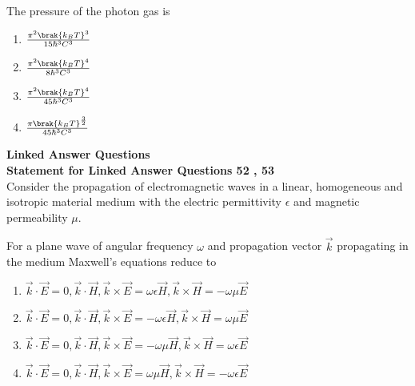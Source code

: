 \begin{enumerate}
\begin{multicols}{2}
\begin{center}
                    \end{center}
            \end{multicols}
            \end{enumerate}

        \item[51.] The pressure of the photon gas is
            \hfill{}
            \begin{enumerate}
                \item $\frac{\pi^2 \brak{k_B T}^3}{15\hbar ^3 C^3}$
                \item $\frac{\pi^2 \brak{k_B T}^4}{8\hbar ^3 C^3}$
                \item $\frac{\pi^2 \brak{k_B T}^4}{45\hbar ^3 C^3}$
                \item $\frac{\pi \brak{k_B T}^\frac{3}{2}}{45\hbar ^3 C^3}$
            \end{enumerate}

            \textbf{Linked Answer Questions}\\
            \textbf{Statement for Linked Answer Questions 52 , 53}\\
            Consider the propagation of electromagnetic waves in a linear, homogeneous and isotropic
            material medium with the electric permittivity $\epsilon$ and magnetic permeability $\mu$.\\
        \item[52.] For a plane wave of angular frequency $\omega$ and propagation vector $\vec{k}$ propagating
            in the medium Maxwell's equations reduce to
            \hfill{}
            \begin{enumerate}
                \item $\vec{k}\cdot \vec{E} = 0, \vec{k}\cdot \vec{H}, \vec{k} \times \vec{E}=\omega\epsilon \vec{H}, \vec{k} \times \vec{H}=-\omega\mu\vec{E}$ 
                \item $\vec{k}\cdot \vec{E} = 0, \vec{k}\cdot \vec{H}, \vec{k} \times \vec{E}=-\omega\epsilon \vec{H}, \vec{k} \times \vec{H}=\omega\mu\vec{E}$ 
                \item $\vec{k}\cdot \vec{E} = 0, \vec{k}\cdot \vec{H}, \vec{k} \times \vec{E}=-\omega\mu \vec{H}, \vec{k} \times \vec{H}=\omega\epsilon\vec{E}$ 
                \item $\vec{k}\cdot \vec{E} = 0, \vec{k}\cdot \vec{H}, \vec{k} \times \vec{E}=\omega\mu \vec{H}, \vec{k} \times \vec{H}=-\omega\epsilon\vec{E}$ 
            \end{enumerate}

